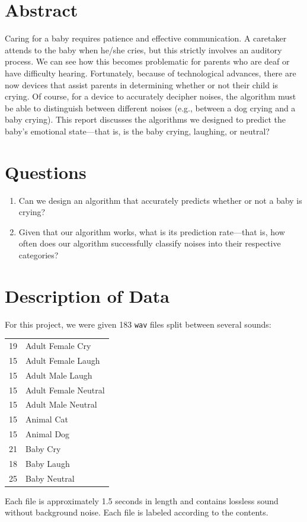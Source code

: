 \documentclass[paper=a4, fontsize=11pt]{scrartcl}
\numberwithin{equation}{section}
\numberwithin{figure}{section}
\numberwithin{table}{section}
\begin{document}
\section{Abstract}
Caring for a baby requires patience and effective communication. A caretaker attends to the baby when he/she cries, but this strictly involves an auditory process. We can see how this becomes problematic for parents who are deaf or have difficulty hearing. Fortunately, because of technological advances, there are now devices that assist parents in determining whether or not their child is crying. Of course, for a device to accurately decipher noises, the algorithm must be able to distinguish between different noises (e.g., between a dog crying and a baby crying). This report discusses the algorithms we designed to predict the baby's emotional state---that is, is the baby crying, laughing, or neutral? 


\section{Questions}
\begin{enumerate}
	\item Can we design an algorithm that accurately predicts whether or not a baby is crying?
	\item Given that our algorithm works, what is its prediction rate---that is, how often does our algorithm successfully classify noises into their respective categories?
\end{enumerate}

%

\section{Description of Data}
For this project, we were given 183 \texttt{wav} files split between several sounds:
\begin{center}
\begin{tabular}{r l}
19 & Adult Female Cry\\
15 & Adult Female Laugh \\
15 & Adult Male Laugh \\
15 & Adult Female Neutral \\
15 & Adult Male Neutral \\
15 & Animal Cat\\
15 & Animal Dog\\
21 & Baby Cry \\
18 & Baby Laugh \\
25 & Baby Neutral
\end{tabular}
\end{center}
Each file is approximately 1.5 seconds in length and contains lossless sound without background noise. Each file is labeled according to the contents. 
\end{document}
